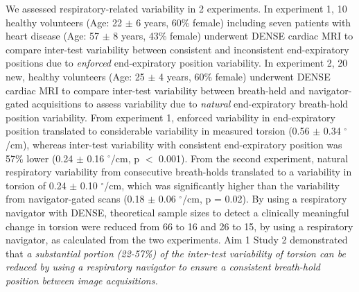 	We assessed respiratory-related variability in 2 experiments. In experiment 1, 10 healthy volunteers (Age: 22 $\pm$ 6 years, 60\% female) including seven patients with heart disease (Age: 57 $\pm$ 8 years, 43\% female) underwent DENSE cardiac MRI to compare inter-test variability between consistent and inconsistent end-expiratory positions due to \textit{enforced} end-expiratory position variability. In experiment 2, 20 new, healthy volunteers (Age: 25 $\pm$ 4 years, 60\% female) underwent DENSE cardiac MRI to compare inter-test variability between breath-held and navigator-gated acquisitions to assess variability due to \textit{natural} end-expiratory breath-hold position variability. From experiment 1, enforced variability in end-expiratory position translated to considerable variability in measured torsion (0.56 $\pm$ 0.34 $^{\circ}$/cm), whereas inter-test variability with consistent end-expiratory position was 57\% lower (0.24 $\pm$ 0.16 $^{\circ}$/cm, p $<$ 0.001). From the second experiment, natural respiratory variability from consecutive breath-holds translated to a variability in torsion of 0.24 $\pm$ 0.10 $^{\circ}$/cm, which was significantly higher than the variability from navigator-gated scans (0.18 $\pm$ 0.06 $^{\circ}$/cm, p = 0.02). By using a respiratory navigator with DENSE, theoretical sample sizes to detect a clinically meaningful change in torsion were reduced from 66 to 16 and 26 to 15, by using a respiratory navigator, as calculated from the two experiments. Aim 1 Study 2 demonstrated that \textit{a substantial portion (22-57\%) of the inter-test variability of torsion can be reduced by using a respiratory navigator to ensure a consistent breath-hold position between image acquisitions.}

